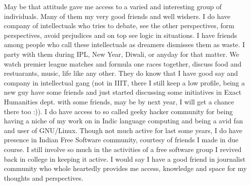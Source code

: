 May be that attitude gave me access to a varied and interesting group of individuals. Many of them 
my very good friends and well wishers. I do have company of intellectuals who tries to debate, see 
the other perspectives, form perspectives, avoid prejudices and on top see logic in situations. I 
have friends among people who call these intellectuals as dreamers dismisses them as waste. I party 
with them during IPL, New Year, Diwali, or anyday for that matter. We watch premier league matches 
and formula one races together, discuss food and restuarants, music, life like any other. They do 
know that I have good say and company in intellectual gang (not in IIIT, there I still keep a low
profile, being a new guy have some friends and just started discussing some initiatives in Exact
Humanities dept. with some friends, may be by next year, I will get a chance there too :)). I do 
have access to so called geeky hacker community for being having a niche of my work on in Indic 
language computing and being a avid fan and user of GNU/Linux. Though not much active for last 
some years, I do have presence in Indian Free Software community, courtesy of friends I made in 
due course. I still involve so much in the activities of a free software group I revived back in 
college in keeping it active. I would say I have a good friend in journalist community who whole
heartedly provides me access, knowledge and space for my thoughts and perspectives.  


